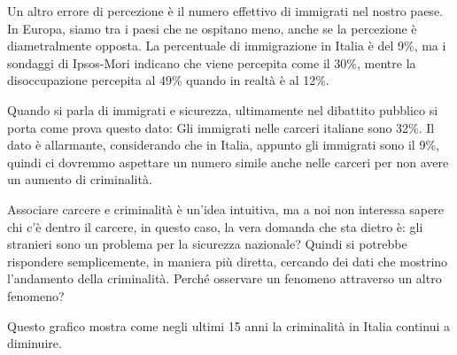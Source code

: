\documentclass[12pt]{book} %
\begin{document}
Un altro errore di percezione è il numero effettivo di immigrati nel nostro paese. In Europa, siamo tra i paesi che ne
ospitano meno, anche se la percezione è diametralmente opposta. La percentuale di immigrazione in Italia è del 9\%, ma
i sondaggi di Ipsos-Mori indicano che viene percepita come il 30\%, mentre la disoccupazione percepita al 49\% quando
in realtà è al 12\%.


\bigskip

Quando si parla di immigrati e sicurezza, ultimamente nel dibattito pubblico si porta come prova questo dato: Gli
immigrati nelle carceri italiane sono 32\%. Il dato è allarmante, considerando che in Italia, appunto gli immigrati
sono il 9\%, quindi ci dovremmo aspettare un numero simile anche nelle carceri per non avere un aumento di criminalità.


Associare carcere e criminalità è un'idea intuitiva, ma a noi non interessa sapere chi
c'è dentro il carcere, in questo caso, la vera domanda che sta dietro è: gli stranieri sono un
problema per la sicurezza nazionale? Quindi si potrebbe rispondere semplicemente, in maniera più diretta, cercando dei
dati che mostrino l'andamento della criminalità. Perché osservare un fenomeno attraverso un altro
fenomeno? 

Questo grafico mostra come negli ultimi 15 anni la criminalità in Italia continui a diminuire.


\bigskip
\end{document}
